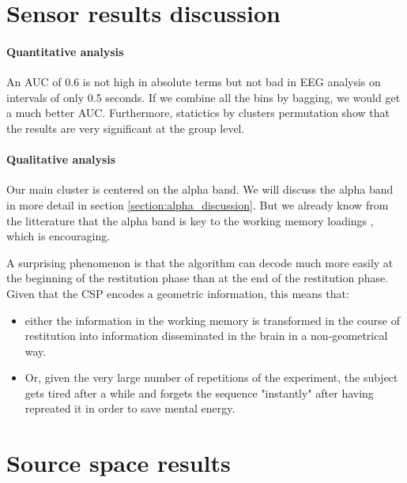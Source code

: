 \section{Sensor results discussion}

\paragraph{Quantitative analysis}
An AUC of 0.6 is not high in absolute terms but not bad in EEG analysis on intervals of only 0.5 seconds. If we combine all the bins by bagging, we would get a much better AUC. Furthermore, statictics by clusters permutation show that the results are very significant at the group level.

\paragraph{Qualitative analysis}

Our main cluster is centered on the alpha band. We will discuss the alpha band in more detail in section \ref{section:alpha_discussion}. But we already know from the litterature that the alpha band is key to the working memory loadings \cite{obleser2012adverse}, which is encouraging.

A surprising phenomenon is that the algorithm can decode much more easily at the beginning of the restitution phase than at the end of the restitution phase. Given that the CSP encodes a geometric information, this means that:
\begin{itemize}
    \item either the information in the working memory is transformed in the course of restitution into information disseminated in the brain in a non-geometrical way.
    \item Or, given the very large number of repetitions of the experiment, the subject gets tired after a while and forgets the sequence "instantly" after having repreated it in order to save mental energy.
\end{itemize}



\section{Source space results}


